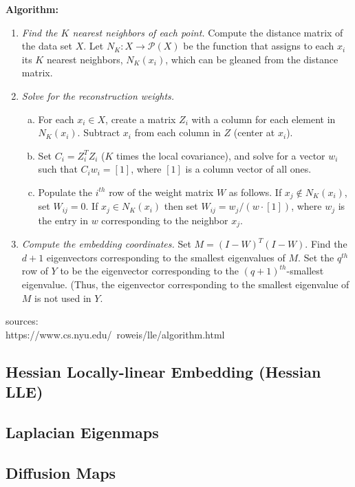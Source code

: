 \documentclass{gtpart}
\theoremstyle{definition}
\begin{document}
{\bf Algorithm:}
\begin{enumerate}[(1)]
\item {\it Find the $K$ nearest neighbors of each point.} Compute the distance matrix of the data set $X$. Let $N_K:X \rightarrow \mathscr{P}(X)$ be the function that assigns to each $x_i$ its $K$ nearest neighbors, $N_K(x_i)$, which can be gleaned from the distance matrix.
\item {\it Solve for the reconstruction weights.} 
	\begin{enumerate}[(a)]
	\item For each $x_i \in X$, create a matrix $Z_i$ with a column for each element in $N_K(x_i)$. Subtract $x_i$ from each column in $Z$ (center at $x_i$). 
	\item Set $C_i = Z_i^T Z_i$ ($K$ times the local covariance), and solve for a vector $w_i$ such that $C_i w_i = [1]$, where $[1]$ is a column vector of all ones. 
	\item Populate the $i^{th}$ row of the weight matrix $W$ as follows. If $x_j \notin N_K(x_i)$, set $W_{ij} = 0$. If $x_j \in N_K(x_i)$ then set $W_{ij} = w_j/(w \cdot [1])$, where $w_j$ is the entry in $w$ corresponding to the neighbor $x_j$.
	\end{enumerate}
\item {\it Compute the embedding coordinates.} Set $M = (I - W)^T(I - W)$. Find the $d + 1$ eigenvectors corresponding to the smallest eigenvalues of $M$. Set the $q^{th}$ row of $Y$ to be the eigenvector corresponding to the $(q+1)^{th}$-smallest eigenvalue. (Thus, the eigenvector corresponding to the smallest eigenvalue of $M$ is not used in $Y$.
\end{enumerate}

sources:\\
https://www.cs.nyu.edu/~roweis/lle/algorithm.html

\subsection{Hessian Locally-linear Embedding (Hessian LLE)}

\subsection{Laplacian Eigenmaps}

\subsection{Diffusion Maps}
\end{document}
